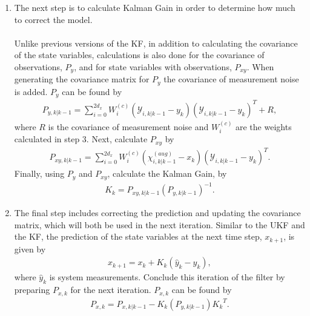 \begin{enumerate}
              
       \item The next step is to calculate Kalman Gain in order to determine how much to correct the model. \\ \\
       Unlike previous versions of the KF, in addition to calculating the covariance of the state variables, calculations is also done for the covariance of observations, $P_{y}$, and for state variables with observations, $P_{xy}$. When generating the covariance matrix for $P_{y}$ the covariance of measurement noise is added. $P_{y}$ can be found by
        \begin{align*}
       P_{y, k | k-1} = \sum^{2d_x}_{i = 0} W_i^{(c)} (\mathcal{Y}_{i, k | k - 1} -   y_{k} )(\mathcal{Y}_{i, k | k - 1} -  y_{k} )^T + R,
       \end{align*}
       where $R$ is the covariance of measurement noise and $W_i^{(c)} $ are the weights calculated in step 3. Next, calculate $P_{xy}$ by
        \begin{align*}
       P_{xy, k | k-1} = \sum^{2d_x}_{i = 0} W_i^{(c)} (\chi^{(aug)}_{i, k | k - 1} -   x_{k } )(\mathcal{Y}_{i, k | k - 1} -  y_{ k } )^T .
       \end{align*}
       Finally, using $P_{y}$ and $P_{xy}$, calculate the Kalman Gain, by
       \begin{align*}
       K_k = P_{xy, k | k-1} (P_{y, k | k-1}) ^{-1}.
       \end{align*}
        
        
        
      \item The final step includes correcting the prediction and updating the covariance matrix, which will both be used in the next iteration. Similar to the UKF and the KF, the prediction of the state variables at the next time step, $x_{k+1}$, is given by 
      \begin{align*}
        x_{k+1} = x_{k} + K_k(\hat y_k - y_{k}),
        \end{align*}
        where $\hat{y}_k$ is system measurements. Conclude this iteration of the filter by preparing $ P_{x, k} $ for the next iteration.  $P_{x, k} $ can be found by
       \begin{align*}
       P_{x, k} = P_{x, k|k-1} -K_k (P_{y, k | k-1} ) {K_k}^T.
       \end{align*}     
  
            
            

\end{enumerate}
